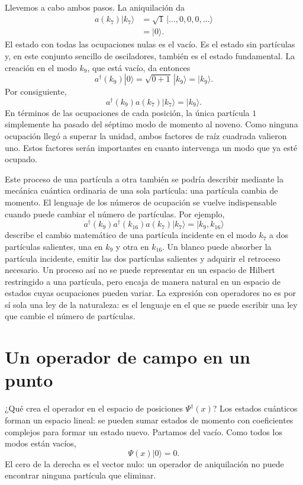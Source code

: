 Llevemos a cabo ambos pasos. La aniquilación da
\begin{align}
a(k_7)|k_7\rangle
&=
\sqrt{1}\,|\ldots,0,0,0,\ldots\rangle\\
&=|0\rangle.
\end{align}
El estado con todas las ocupaciones nulas es el vacío. Es el estado sin partículas y, en este conjunto sencillo de osciladores, también es el estado fundamental. La creación en el modo \(k_9\), que está vacío, da entonces
\begin{equation}
a^\dagger(k_9)|0\rangle
=\sqrt{0+1}\,|k_9\rangle
=|k_9\rangle.
\end{equation}
Por consiguiente,
\begin{equation}
a^\dagger(k_9)a(k_7)|k_7\rangle=|k_9\rangle.
\end{equation}
En términos de las ocupaciones de cada posición, la única partícula \(1\) simplemente ha pasado del séptimo modo de momento al noveno. Como ninguna ocupación llegó a superar la unidad, ambos factores de raíz cuadrada valieron uno. Estos factores serán importantes en cuanto intervenga un modo que ya esté ocupado.

Este proceso de una partícula a otra también se podría describir mediante la mecánica cuántica ordinaria de una sola partícula: una partícula cambia de momento. El lenguaje de los números de ocupación se vuelve indispensable cuando puede cambiar el número de partículas. Por ejemplo,
\begin{equation}
a^\dagger(k_9)a^\dagger(k_{16})a(k_7)|k_7\rangle
=|k_9,k_{16}\rangle
\end{equation}
describe el cambio matemático de una partícula incidente en el modo \(k_7\) a dos partículas salientes, una en \(k_9\) y otra en \(k_{16}\). Un blanco puede absorber la partícula incidente, emitir las dos partículas salientes y adquirir el retroceso necesario. Un proceso así no se puede representar en un espacio de Hilbert restringido a una partícula, pero encaja de manera natural en un espacio de estados cuyas ocupaciones pueden variar. La expresión con operadores no es por sí sola una ley de la naturaleza: es el lenguaje en el que se puede escribir una ley que cambie el número de partículas.

\section{Un operador de campo en un punto}

¿Qué crea el operador en el espacio de posiciones \(\Psi^\dagger(x)\)? Los estados cuánticos forman un espacio lineal: se pueden sumar estados de momento con coeficientes complejos para formar un estado nuevo. Partamos del vacío. Como todos los modos están vacíos,
\begin{equation}
\Psi(x)|0\rangle=0.
\end{equation}
El cero de la derecha es el vector nulo: un operador de aniquilación no puede encontrar ninguna partícula que eliminar.

